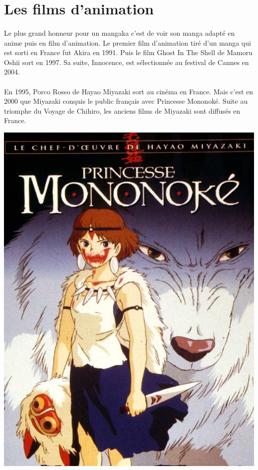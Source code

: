 \section{Les films d'animation}
\paragraph{}
Le plus grand honneur pour un mangaka c’est de voir son manga adapté en anime puis en film d’animation. Le premier film d’animation tiré d’un manga qui est sorti en France fut Akira en 1991. Puis le film Ghost In The Shell de Mamoru Oshii sort en 1997. Sa suite, Innocence, est sélectionnée au festival de Cannes en 2004.
\paragraph{}
En 1995, Porco Rosso de Hayao Miyazaki sort au cinéma en France. Mais c’est en 2000 que Miyazaki conquis le public français avec Princesse Mononoké. Suite au triomphe du Voyage de Chihiro, les anciens films de Miyazaki sont diffusés en France. 
\begin{center}
\includegraphics[scale=0.2]{miyazaki.jpg}
\end{center}
